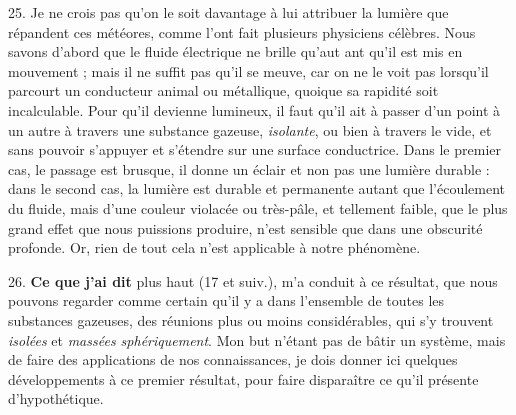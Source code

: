 \documentclass[a4paper, 11pt, oneside, polutonikogreek, french]{article}
\begin{document}
25. Je ne crois pas qu'on le soit davantage à lui attribuer la lumière que répandent ces météores, comme l'ont fait plusieurs physiciens célèbres. Nous savons d'abord que le fluide électrique ne brille qu'aut ant qu'il est mis en mouvement ; mais il ne suffit pas qu'il se meuve, car on ne le voit pas lorsqu'il parcourt un conducteur animal ou métallique, quoique sa rapidité soit incalculable. Pour qu'il devienne lumineux, il faut qu'il ait à passer d'un point à un autre à travers une substance gazeuse, \emph{isolante}, ou bien à travers le vide, et sans pouvoir s'appuyer et s'étendre sur une surface conductrice. Dans le premier cas, le passage est brusque, il donne un éclair et non pas une lumière durable : dans le second cas, la lumière est durable et permanente autant que l'écoulement du fluide, mais d'une couleur violacée ou très-pâle, et tellement faible, que le plus grand effet que nous puissions produire, n'est sensible que dans une obscurité profonde. Or, rien de tout cela n'est applicable à notre phénomène.

26. \textbf{Ce que j'ai dit} plus haut (17 et suiv.), m'a conduit à ce résultat, que nous pouvons regarder comme certain qu'il y a dans l'ensemble de toutes les substances gazeuses, des réunions plus ou moins considérables, qui s'y trouvent \emph{isolées} et \emph{massées sphériquement}. Mon but n'étant pas de bâtir un système, mais de faire des applications de nos connaissances, je dois donner ici quelques développements à ce premier résultat, pour faire disparaître ce qu'il présente d'hypothétique.
\end{document}
